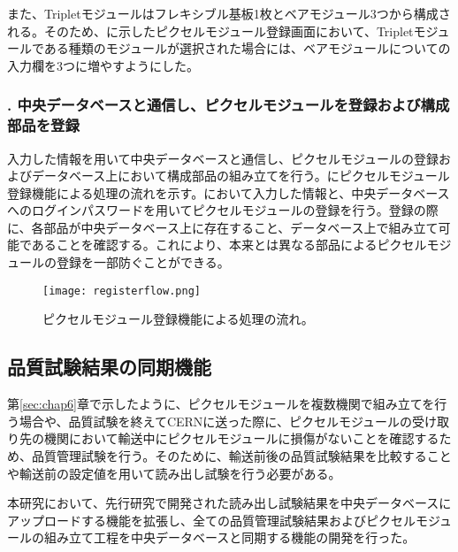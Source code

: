 また、Tripletモジュールはフレキシブル基板1枚とベアモジュール3つから構成される。そのため、に示したピクセルモジュール登録画面において、Tripletモジュールである種類のモジュールが選択された場合には、ベアモジュールについての入力欄を3つに増やすようにした。

\subsubsection{. 中央データベースと通信し、ピクセルモジュールを登録および構成部品を登録}

入力した情報を用いて中央データベースと通信し、ピクセルモジュールの登録およびデータベース上において構成部品の組み立てを行う。にピクセルモジュール登録機能による処理の流れを示す。において入力した情報と、中央データベースへのログインパスワードを用いてピクセルモジュールの登録を行う。登録の際に、各部品が中央データベース上に存在すること、データベース上で組み立て可能であることを確認する。これにより、本来とは異なる部品によるピクセルモジュールの登録を一部防ぐことができる。

\begin{figure}[tbp]
  \centering
  \texttt{[image: registerflow.png]}
  \caption[ピクセルモジュール登録機能による処理の流れ]{ピクセルモジュール登録機能による処理の流れ。}
  \label{fig:dbregistermodule}
\end{figure}


\subsection{品質試験結果の同期機能}
\label{sec:upload-result}

第\ref{sec:chap6}章で示したように、ピクセルモジュールを複数機関で組み立てを行う場合や、品質試験を終えてCERNに送った際に、ピクセルモジュールの受け取り先の機関において輸送中にピクセルモジュールに損傷がないことを確認するため、品質管理試験を行う。そのために、輸送前後の品質試験結果を比較することや輸送前の設定値を用いて読み出し試験を行う必要がある。

本研究において、先行研究\cite{oku}で開発された読み出し試験結果を中央データベースにアップロードする機能を拡張し、全ての品質管理試験結果およびピクセルモジュールの組み立て工程を中央データベースと同期する機能の開発を行った。


